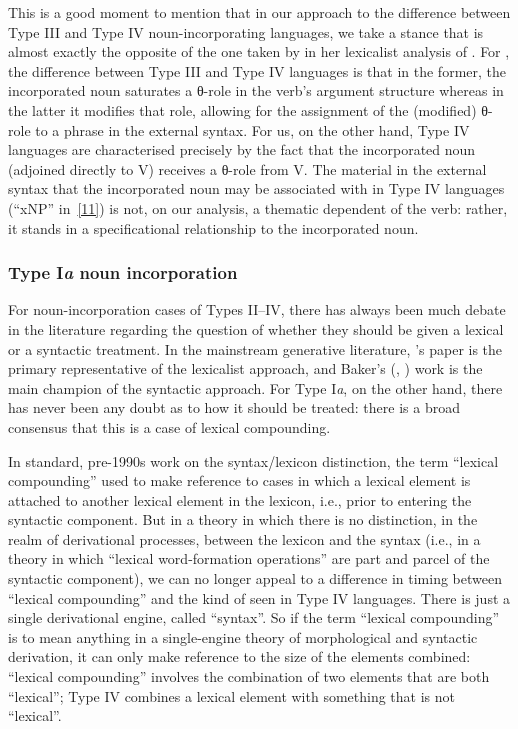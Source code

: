 \documentclass[output=paper]{langsci/langscibook}
\newcommand{\posscite}[1]{\citeauthor{#1}'s \citeyearpar{#1}}
\begin{document}
\begin{refcontext}
This is a good moment to mention that in our approach to the difference between Type III
and Type IV noun-incorporating languages, we take a stance that is almost exactly the opposite of
the one taken by \cite{rosen89} in her lexicalist analysis of . For \cite{rosen89},
the difference between Type III and Type IV languages is that in the former, the incorporated noun
saturates a θ{}-role in the verb's argument structure whereas in the latter it modifies that role, allowing
for the assignment of the (modified) θ{}-role to a phrase in the external syntax. For us, on the other
hand, Type IV languages are characterised precisely by the fact that the incorporated noun (adjoined
directly to V) receives a θ{}-role from V. The material in the external syntax that the incorporated noun
may be associated with in Type IV languages (\enquote{xNP} in~\eqref{11}) is not, on our analysis, a thematic
dependent of the verb: rather, it stands in a specificational relationship to the incorporated noun.

\subsubsection{Type I\emph{a} noun incorporation}
For noun-incorporation cases of Types II–IV, there has always been much debate in the literature
regarding the question of whether they should be given a lexical or a syntactic treatment. In the mainstream
generative literature, \posscite{rosen89} paper is the primary representative of the lexicalist
approach, and Baker’s (\citeyear{baker88}, \citeyear{baker96}) work is the main champion of the syntactic approach. For Type
I\emph{a}, on the other hand, there has never been any doubt as to how it should be treated: there is a broad
consensus that this is a case of lexical compounding.

In standard, pre-1990s work on the syntax/lexicon distinction, the term
\enquote{lexical compounding} used to make reference to cases in which a
lexical element is attached to another lexical element in the lexicon, i.e.,
prior to entering the syntactic component. But in a theory in which there is no
distinction, in the realm of derivational processes, between the lexicon and
the syntax (i.e., in a theory in which \enquote{lexical word-formation
operations} are part and parcel of the syntactic component), we can no longer
appeal to a difference in timing between \enquote{lexical compounding} and the
kind of  seen in Type IV languages. There is just a single
derivational engine, called \enquote{syntax}. So if the term \enquote{lexical
compounding} is to mean anything in a single-engine theory of morphological and
syntactic derivation, it can only make reference to the size of the elements
combined: \enquote{lexical compounding} involves the combination of two
elements that are both \enquote{lexical}; Type IV  combines a
lexical element with something that is not \enquote{lexical}.


\end{refcontext}
\end{document}
